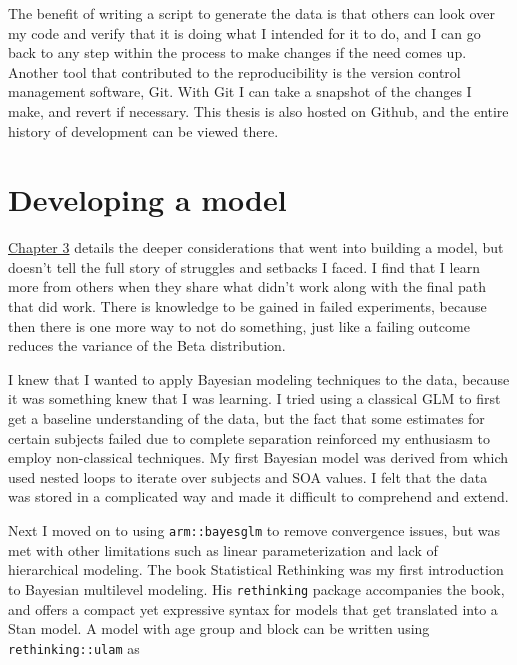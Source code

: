 \documentclass[11pt, oneside, openany]{scrbook}
\begin{document}
The benefit of writing a script to generate the data is that others can look over my code and verify that it is doing what I intended for it to do, and I can go back to any step within the process to make changes if the need comes up. Another tool that contributed to the reproducibility is the version control management software, Git. With Git I can take a snapshot of the changes I make, and revert if necessary. This thesis is also hosted on Github, and the entire history of development can be viewed there.

\hypertarget{developing-a-model}{%
\section{Developing a model}\label{developing-a-model}}

\protect\hyperlink{workflow}{Chapter 3} details the deeper considerations that went into building a model, but doesn't tell the full story of struggles and setbacks I faced. I find that I learn more from others when they share what didn't work along with the final path that did work. There is knowledge to be gained in failed experiments, because then there is one more way to not do something, just like a failing outcome reduces the variance of the Beta distribution.

I knew that I wanted to apply Bayesian modeling techniques to the data, because it was something knew that I was learning. I tried using a classical GLM to first get a baseline understanding of the data, but the fact that some estimates for certain subjects failed due to complete separation reinforced my enthusiasm to employ non-classical techniques. My first Bayesian model was derived from \citet{lee2014bayesian} which used nested loops to iterate over subjects and SOA values. I felt that the data was stored in a complicated way and made it difficult to comprehend and extend.

Next I moved on to using \texttt{arm::bayesglm} to remove convergence issues, but was met with other limitations such as linear parameterization and lack of hierarchical modeling. The book Statistical Rethinking \citep{mcelreath2020statistical} was my first introduction to Bayesian multilevel modeling. His \texttt{rethinking} package accompanies the book, and offers a compact yet expressive syntax for models that get translated into a Stan model. A model with age group and block can be written using \texttt{rethinking::ulam} as
\end{document}
